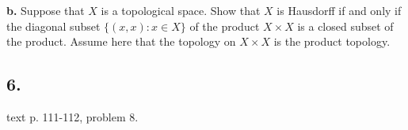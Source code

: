 \documentclass{amsart}
\theoremstyle{plain}
\theoremstyle{definition}
\theoremstyle{remark}
\begin{document}
{\bf b.} Suppose that $X$ is a topological space. Show that $X$ is Hausdorff if and only if the diagonal subset $\{ (x , x ) : x\in X\}$ of the product $X\times X$ is a closed subset of the product. Assume here that the topology on $X\times X$ is the product topology.



\vspace{.15in}

\noindent
\subsection*{6.} text p. 111-112, problem 8. 



 
\end{document}
